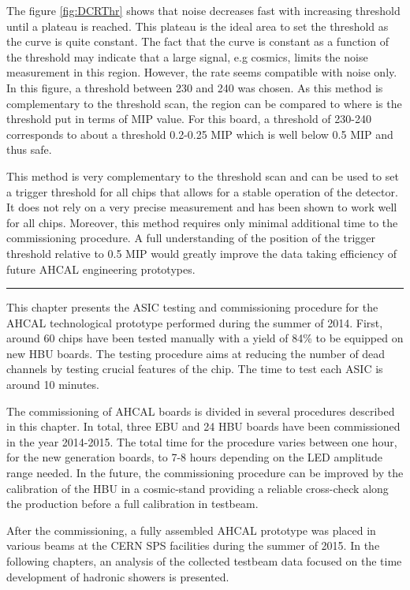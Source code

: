 The figure \ref{fig:DCRThr} shows that noise decreases fast with increasing threshold until a plateau is reached. This plateau is the ideal area to set the threshold as the curve is quite constant. The fact that the curve is constant as a function of the threshold may indicate that a large signal, e.g cosmics, limits the noise measurement in this region. However, the rate seems compatible with noise only. In this figure, a threshold between 230 and 240 was chosen. As this method is complementary to the threshold scan, the region can be compared to where is the threshold put in terms of MIP value. For this board, a threshold of 230-240 corresponds to about a threshold 0.2-0.25 MIP which is well below 0.5 MIP and thus safe.

This method is very complementary to the threshold scan and can be used to set a trigger threshold for all chips that allows for a stable operation of the detector. It does not rely on a very precise measurement and has been shown to work well for all chips. Moreover, this method requires only minimal additional time to the commissioning procedure. A full understanding of the position of the trigger threshold relative to 0.5 MIP would greatly improve the data taking efficiency of future AHCAL engineering prototypes.

\begin{center}
  \rule{0.5\textwidth}{.4pt}
\end{center}

This chapter presents the ASIC testing and commissioning procedure for the AHCAL technological prototype performed during the summer of 2014. First, around 60 chips have been tested manually with a yield of 84\% to be equipped on new HBU boards. The testing procedure aims at reducing the number of dead channels by testing crucial features of the chip. The time to test each ASIC is around 10 minutes.

The commissioning of AHCAL boards is divided in several procedures described in this chapter. In total, three EBU and 24 HBU boards have been commissioned in the year 2014-2015. The total time for the procedure varies between one hour, for the new generation boards, to 7-8 hours depending on the LED amplitude range needed. In the future, the commissioning procedure can be improved by the calibration of the HBU in a cosmic-stand providing a reliable cross-check along the production before a full calibration in testbeam.

After the commissioning, a fully assembled AHCAL prototype was placed in various beams at the CERN SPS facilities during the summer of 2015. In the following chapters, an analysis of the collected testbeam data focused on the time development of hadronic showers is presented.

